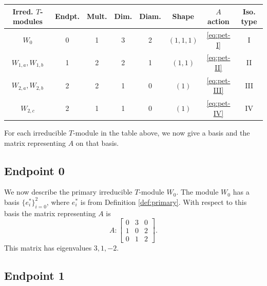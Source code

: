 \documentclass[12pt,letterpaper]{article}
\begin{document}
\begin{center}
\begin{tabular}{c | c c c c c c c}
\toprule
\textbf{Irred. $T$-modules} & \textbf{Endpt.} & \textbf{Mult.} & \textbf{Dim.} & \textbf{Diam.} & \textbf{Shape} & $A$ \textbf{action} & \textbf{Iso. type} \\
\midrule
$W_0$ & 0 & 1 & 3 & 2 & $(1,1,1)$ & \eqref{eq:pet-I} & I \\
$W_{1,a}, W_{1,b}$ & 1 & 2 & 2 & 1 & $(1,1)$ & \eqref{eq:pet-II} & II \\
$W_{2,a},W_{2,b}$ & 2 & 2 & 1 & 0 & $(1)$ & \eqref{eq:pet-III} & III \\
$W_{2,c}$ & 2 & 1 & 1 & 0 & $(1)$ & \eqref{eq:pet-IV} & IV \\
\bottomrule
\end{tabular}

\smallskip
{}
\end{center}

For each irreducible $T$-module in the table above, we now give a basis and the matrix representing $A$ on that basis. 

\subsection{Endpoint 0}

We now describe the primary irreducible $T$-module $W_0$. The module $W_0$ has a basis $\{e_i^*\}_{i=0}^2$, where $e_i^*$ is from Definition \ref{def:primary}. With respect to this basis the matrix representing $A$ is
\begin{equation}
    A: \begin{bmatrix}
  0 & 3 & 0 \\
  1 & 0 & 2 \\
  0 & 1 & 2
\end{bmatrix}.
\label{eq:pet-I}
\end{equation}
This matrix has eigenvalues $3, 1, -2$.

\subsection{Endpoint 1}
\end{document}
